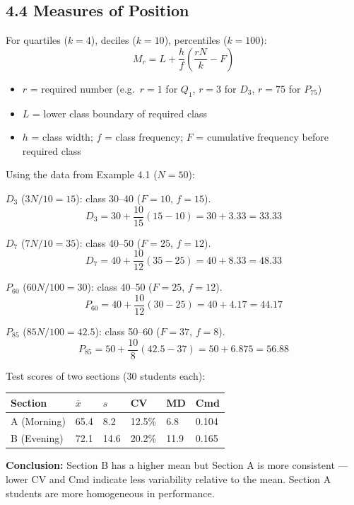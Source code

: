 \documentclass[12pt]{article}
\newcommand{\hcell}[1]{\textbf{\color{white}#1}}
\begin{document}
\subsection{4.4 Measures of Position}

\begin{defbox}
For quartiles ($k=4$), deciles ($k=10$), percentiles ($k=100$):
\[
M_r = L + \frac{h}{f}\!\left(\frac{rN}{k}-F\right)
\]
\begin{itemize}[noitemsep]
  \item $r$ = required number (e.g.\ $r=1$ for $Q_1$, $r=3$ for $D_3$, $r=75$ for $P_{75}$)
  \item $L$ = lower class boundary of required class
  \item $h$ = class width; $f$ = class frequency; $F$ = cumulative frequency before required class
\end{itemize}
\end{defbox}

\begin{examplebox}
Using the data from Example 4.1 ($N=50$):

\textbf{$D_3$} ($3N/10=15$): class 30--40 ($F=10$, $f=15$).
\[D_3=30+\frac{10}{15}(15-10)=30+3.33=\mathbf{33.33}\]

\textbf{$D_7$} ($7N/10=35$): class 40--50 ($F=25$, $f=12$).
\[D_7=40+\frac{10}{12}(35-25)=40+8.33=\mathbf{48.33}\]

\textbf{$P_{60}$} ($60N/100=30$): class 40--50 ($F=25$, $f=12$).
\[P_{60}=40+\frac{10}{12}(30-25)=40+4.17=\mathbf{44.17}\]

\textbf{$P_{85}$} ($85N/100=42.5$): class 50--60 ($F=37$, $f=8$).
\[P_{85}=50+\frac{10}{8}(42.5-37)=50+6.875=\mathbf{56.88}\]
\end{examplebox}

\begin{examplebox}
Test scores of two sections (30 students each):

\begin{center}{\small
\begin{tabular}{|l|C{1.5cm}|C{1.5cm}|C{1.5cm}|C{1.5cm}|C{1.5cm}|}
\hline{}
\hcell{Section}&\hcell{$\bar x$}&\hcell{$s$}&\hcell{CV}&\hcell{MD}&\hcell{Cmd}\\\hline
A (Morning)&65.4&8.2&12.5\%&6.8&0.104\\\hline
B (Evening)&72.1&14.6&20.2\%&11.9&0.165\\\hline
\end{tabular}}
\end{center}
\textbf{Conclusion:} Section B has a higher mean but Section A is more consistent --- lower CV and Cmd indicate less variability relative to the mean. Section A students are more homogeneous in performance.
\end{examplebox}
\end{document}
